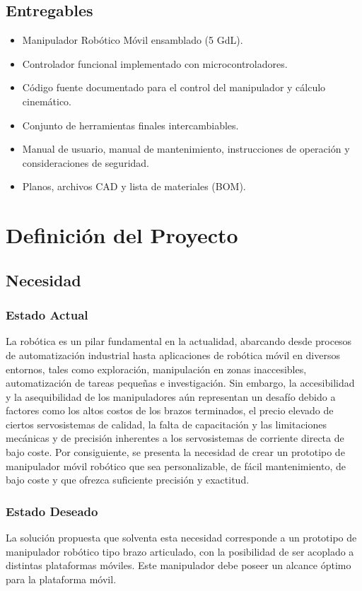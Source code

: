 \documentclass[12pt, a4paper]{article}
\begin{document}
\subsection{Entregables}
\begin{itemize}
    \item Manipulador Robótico Móvil ensamblado (5 GdL).
    \item Controlador funcional implementado con microcontroladores.
    \item Código fuente documentado para el control del manipulador y cálculo cinemático.
    \item Conjunto de herramientas finales intercambiables.
    \item Manual de usuario, manual de mantenimiento, instrucciones de operación y consideraciones de seguridad.
    \item Planos, archivos CAD y lista de materiales (BOM).
\end{itemize}

\section{Definición del Proyecto}

\subsection{Necesidad}
\subsubsection{Estado Actual}
La robótica es un pilar fundamental en la actualidad, abarcando desde procesos de automatización industrial hasta aplicaciones de robótica móvil en diversos entornos, tales como exploración, manipulación en zonas inaccesibles, automatización de tareas pequeñas e investigación. Sin embargo, la accesibilidad y la asequibilidad de los manipuladores aún representan un desafío debido a factores como los altos costos de los brazos terminados, el precio elevado de ciertos servosistemas de calidad, la falta de capacitación y las limitaciones mecánicas y de precisión inherentes a los servosistemas de corriente directa de bajo coste. Por consiguiente, se presenta la necesidad de crear un prototipo de manipulador móvil robótico que sea personalizable, de fácil mantenimiento, de bajo coste y que ofrezca suficiente precisión y exactitud.

\subsubsection{Estado Deseado}
La solución propuesta que solventa esta necesidad corresponde a un prototipo de manipulador robótico tipo brazo articulado, con la posibilidad de ser acoplado a distintas plataformas móviles. Este manipulador debe poseer un alcance óptimo para la plataforma móvil.
\end{document}
